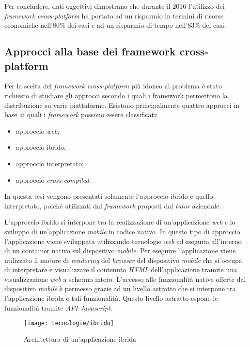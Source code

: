 Per concludere, dati oggettivi dimostrano che durante il 2016 l'utilizzo dei \textit{framework cross-platform} ha portato ad un risparmio in termini di risorse economiche nell'80\% dei casi e ad un risparmio di tempo nell'83\% dei casi.

\subsection{Approcci alla base dei framework cross-platform}

Per la scelta del \textit{framework cross-platform} più idoneo al problema è stato richiesto di studiare gli approcci secondo i quali i framework permettono la distribuzione su varie piattaforme. Esistono principalmente quattro approcci in base ai quali i \textit{framework} possono essere classificati:
\begin{itemize}
	\item approccio \textit{web};
	\item approccio ibrido;
	\item approccio interpretato;
	\item approccio \textit{cross-compiled}.
\end{itemize}

In questa tesi vengono presentati solamente l'approccio ibrido e quello interpretato, poiché utilizzati dai \textit{framework} proposti dal \textit{tutor} aziendale.

L'approccio ibrido si interpone tra la realizzazione di un'applicazione \textit{web} e lo sviluppo di un'applicazione \textit{mobile} in codice nativo. In questo tipo di approccio l'applicazione viene sviluppata utilizzando tecnologie \textit{web} ed eseguita all'interno di un container nativo sul dispositivo \textit{mobile}. Per eseguire l'applicazione viene utilizzato il motore di \textit{rendering} del \textit{browser} del dispositivo \textit{mobile} che si occupa di interpretare e visualizzare il contenuto \textit{HTML} dell'applicazione tramite una visualizzazione \textit{web} a schermo intero. L'accesso alle funzionalità native offerte dal dispositivo \textit{mobile} è permesso grazie ad un livello astratto che si interpone tra l'applicazione ibrida e tali funzionalità. Questo livello astratto espone le funzionalità tramite \textit{API} \textit{Javascript}. 

\begin{figure}[!h] 
    \centering 
    \texttt{[image: tecnologie/ibrido]} 
    \caption{Architettura di un'applicazione ibrida}
\end{figure}

